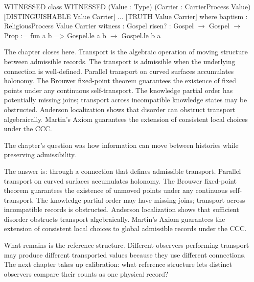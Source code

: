 \begin{leanexcerpt}{WITNESSED}
class WITNESSED
    (Value : Type)
    (Carrier : CarrierProcess Value)
    [DISTINGUISHABLE Value Carrier] ... [TRUTH Value Carrier]
  where
  baptism : ReligiousProcess Value Carrier
  witness : Gospel
  risen? : Gospel $\to$ Gospel $\to$ Prop := fun a b =>
    Gospel.le a b $\to$ Gospel.le b a
\end{leanexcerpt}

The chapter closes here. Transport is the algebraic operation of
moving structure between admissible records. The transport is
admissible when the underlying connection is well-defined.
Parallel transport on curved surfaces accumulates holonomy. The
Brouwer fixed-point theorem guarantees the existence of fixed
points under any continuous self-transport. The knowledge
partial order has potentially missing joins; transport across
incompatible knowledge states may be obstructed. Anderson
localization shows that disorder can obstruct transport
algebraically. Martin's Axiom guarantees the extension of
consistent local choices under the CCC.

\begin{bridge}

The chapter's question was how information can move between
histories while preserving admissibility.

The answer is: through a connection that defines admissible
transport. Parallel transport on curved surfaces accumulates
holonomy. The Brouwer fixed-point theorem guarantees the existence
of unmoved points under any continuous self-transport. The
knowledge partial order may have missing joins; transport across
incompatible records is obstructed. Anderson localization shows
that sufficient disorder obstructs transport algebraically.
Martin's Axiom guarantees the extension of consistent local
choices to global admissible records under the CCC.

What remains is the reference structure. Different observers
performing transport may produce different transported values
because they use different connections. The next chapter takes up
calibration: what reference structure lets distinct observers
compare their counts as one physical record?

\end{bridge}

